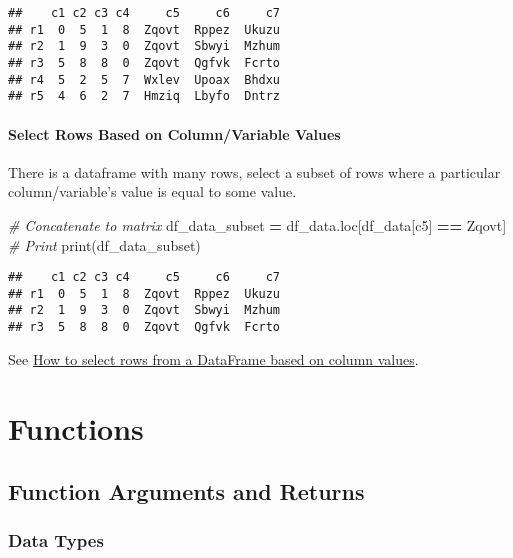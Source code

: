 \documentclass[
]{book}
\newenvironment{Shaded}{\begin{snugshade}}{\end{snugshade}}
\newcommand{\BuiltInTok}[1]{#1}
\newcommand{\CommentTok}[1]{\textcolor[rgb]{0.56,0.35,0.01}{\textit{#1}}}
\newcommand{\NormalTok}[1]{#1}
\newcommand{\OperatorTok}[1]{\textcolor[rgb]{0.81,0.36,0.00}{\textbf{#1}}}
\newcommand{\StringTok}[1]{\textcolor[rgb]{0.31,0.60,0.02}{#1}}
\begin{document}
\begin{verbatim}
##    c1 c2 c3 c4     c5     c6     c7
## r1  0  5  1  8  Zqovt  Rppez  Ukuzu
## r2  1  9  3  0  Zqovt  Sbwyi  Mzhum
## r3  5  8  8  0  Zqovt  Qgfvk  Fcrto
## r4  5  2  5  7  Wxlev  Upoax  Bhdxu
## r5  4  6  2  7  Hmziq  Lbyfo  Dntrz
\end{verbatim}

\hypertarget{select-rows-based-on-columnvariable-values}{%
\subsubsection{Select Rows Based on Column/Variable Values}\label{select-rows-based-on-columnvariable-values}}

There is a dataframe with many rows, select a subset of rows where a particular column/variable's value is equal to some value.

\begin{Shaded}
\begin{Highlighting}[]
\CommentTok{\# Concatenate to matrix}
\NormalTok{df\_data\_subset }\OperatorTok{=}\NormalTok{ df\_data.loc[df\_data[}\StringTok{\textquotesingle{}c5\textquotesingle{}}\NormalTok{] }\OperatorTok{==} \StringTok{\textquotesingle{}Zqovt\textquotesingle{}}\NormalTok{]}
\CommentTok{\# Print}
\BuiltInTok{print}\NormalTok{(df\_data\_subset)}
\end{Highlighting}
\end{Shaded}

\begin{verbatim}
##    c1 c2 c3 c4     c5     c6     c7
## r1  0  5  1  8  Zqovt  Rppez  Ukuzu
## r2  1  9  3  0  Zqovt  Sbwyi  Mzhum
## r3  5  8  8  0  Zqovt  Qgfvk  Fcrto
\end{verbatim}

See \href{https://stackoverflow.com/a/17071908/8280804}{How to select rows from a DataFrame based on column values}.

\hypertarget{functions}{%
\chapter{Functions}\label{functions}}

\hypertarget{function-arguments-and-returns}{%
\section{Function Arguments and Returns}\label{function-arguments-and-returns}}

\hypertarget{data-types}{%
\subsection{Data Types}\label{data-types}}
\end{document}
